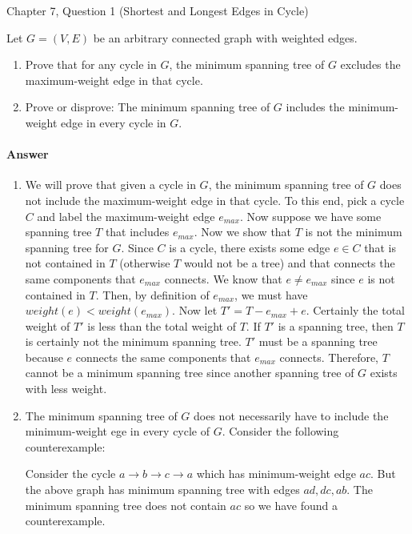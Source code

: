 \documentclass{article}
\begin{document}

\nextprob
{}

Chapter 7, Question 1 (Shortest and Longest Edges in Cycle)

Let $G = (V, E)$ be an arbitrary connected graph with weighted edges.
\begin{enumerate}[label=(\alph*)]
    \item Prove that for any cycle in $G$, the minimum spanning tree of $G$ excludes the maximum-weight edge in that cycle.
    \item Prove or disprove: The minimum spanning tree of $G$ includes the minimum-weight edge in every cycle in $G$.
\end{enumerate}

\paragraph{Answer}


\begin{enumerate}[label=(\alph*)]
    \item We will prove that given a cycle in $G$, the minimum spanning tree of $G$ does not include the maximum-weight edge in that cycle.
    To this end, pick a cycle $C$ and label the maximum-weight edge $e_{max}$.
    Now suppose we have some spanning tree $T$ that includes $e_{max}$.
    Now we show that $T$ is not the minimum spanning tree for $G$. \parspace
    Since $C$ is a cycle, there exists some edge $e \in C$ that is not contained in $T$ (otherwise $T$ would not be a tree) and that connects the same components that $e_{max}$ connects.
    We know that $e \neq e_{max}$ since $e$ is not contained in $T$.
    Then, by definition of $e_{max}$, we must have $weight(e) < weight(e_{max})$.
    Now let $T' = T - e_{max} + e$.
    Certainly the total weight of $T'$ is less than the total weight of $T$.
    If $T'$ is a spanning tree, then $T$ is certainly not the minimum spanning tree.
    $T'$ must be a spanning tree because $e$ connects the same components that $e_{max}$ connects.
    Therefore, $T$ cannot be a minimum spanning tree since another spanning tree of $G$ exists with less weight.
    \item The minimum spanning tree of $G$ does not necessarily have to include the minimum-weight ege in every cycle of $G$.
    Consider the following counterexample:
    \begin{center}\end{center}
    Consider the cycle $a \to b \to c \to a$ which has minimum-weight edge $ac$.
    But the above graph has minimum spanning tree with edges $ad, dc, ab$.
    The minimum spanning tree does not contain $ac$ so we have found a counterexample.
\end{enumerate}
\end{document}
